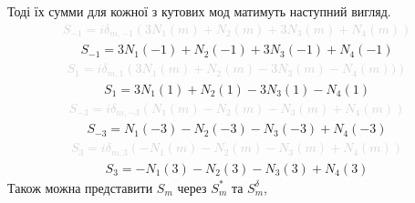 %
Тоді їх сумми для кожної з кутових мод матимуть наступний вигляд. 
%
\textcolor{lightgray} { \begin{equation*} \begin{aligned}
S_{-1} = i \delta_{m,-1} \left( 3 N_1 (m) + N_2 (m) + 
3 N_3 (m) + N_4 (m) \right)
\end{aligned} \end{equation*} }
%
\begin{equation} \begin{aligned} \label{eq:nm1sum}
S_{-1} = 3 N_1 (-1) + N_2 (-1) + 3 N_3 (-1) + N_4 (-1)
\end{aligned} \end{equation}
%
\textcolor{lightgray} { \begin{equation*} \begin{aligned}
S_{1} = i \delta_{m,1} \left( 3 N_1 (m) + N_2 (m) - 
3 N_3 (m) - N_4 (m) ) \right)
\end{aligned} \end{equation*} }
%
\begin{equation} \begin{aligned} \label{eq:np1sum}
S_{1} = 3 N_1 (1) + N_2 (1) - 3 N_3 (1) - N_4 (1)
\end{aligned} \end{equation}
%
\textcolor{lightgray} { \begin{equation*} \begin{aligned}
S_{-3} = i \delta_{m,-3} \left( N_1 (m) - N_2 (m) - 
N_3 (m) + N_4 (m) \right)
\end{aligned} \end{equation*} }
%
\begin{equation} \begin{aligned} \label{eq:nm3sum}
S_{-3} = N_1 (-3) - N_2 (-3) - N_3 (-3) + N_4 (-3)
\end{aligned} \end{equation}
%
\textcolor{lightgray} { \begin{equation*} \begin{aligned}
S_{3} = i \delta_{m,3} \left( - N_1 (m) - N_2 (m) - 
N_3 (m) + N_4 (m) \right)
\end{aligned} \end{equation*} }
%
\begin{equation} \begin{aligned} \label{eq:np3sum}
S_{3} = - N_1 (3) - N_2 (3) - N_3 (3) + N_4 (3)
\end{aligned} \end{equation}
%
Також можна представити $ S_m $ через $ S_m^* $ та $ S_m^\delta $, 
